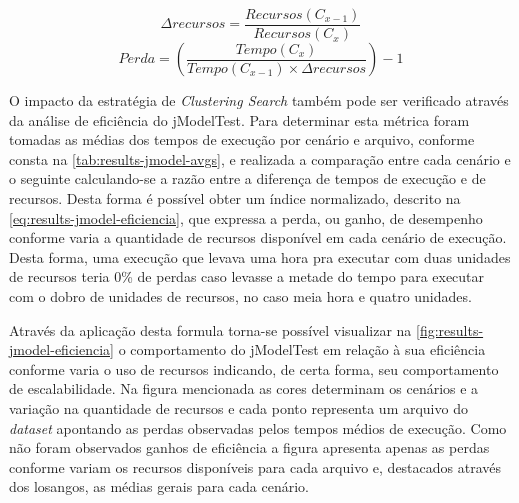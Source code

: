 \documentclass[english,brazilian]{UNISINOSmonografia} %
\begin{document}
\begin{equation}
\Delta{recursos} = \dfrac{Recursos(C_{x-1})}{Recursos(C_{x})}
\end{equation}
\begin{equation}\label{eq:results-jmodel-eficiencia}
Perda = 
\left(
	\dfrac
		{Tempo(C_{x})}
		{Tempo(C_{x-1}) \times \Delta{recursos}}
\right)-1
\end{equation}


O impacto da estratégia de \textit{Clustering Search} também pode ser verificado através da análise de eficiência do jModelTest.
%
Para determinar esta métrica foram tomadas as médias dos tempos de execução por cenário e arquivo, conforme consta na \autoref{tab:results-jmodel-avgs}, e realizada a comparação entre cada cenário e o seguinte calculando-se a razão entre a diferença de tempos de execução e de recursos.
%
Desta forma é possível obter um índice normalizado, descrito na \autoref{eq:results-jmodel-eficiencia}, que expressa a perda, ou ganho, de desempenho conforme varia a quantidade de recursos disponível em cada cenário de execução.
%
Desta forma, uma execução que levava uma hora pra executar com duas unidades de recursos teria 0\% de perdas caso levasse a metade do tempo para executar com o dobro de unidades de recursos, no caso meia hora e quatro unidades.



Através da aplicação desta formula torna-se possível visualizar na \autoref{fig:results-jmodel-eficiencia} o comportamento do jModelTest em relação à sua eficiência conforme varia o uso de recursos indicando, de certa forma, seu comportamento de escalabilidade.
%
Na figura mencionada as cores determinam os cenários e a variação na quantidade de recursos e cada ponto representa um arquivo do \textit{dataset} apontando as perdas observadas pelos tempos médios de execução.
%
Como não foram observados ganhos de eficiência a figura apresenta apenas as perdas conforme variam os recursos disponíveis para cada arquivo e, destacados através dos losangos, as médias gerais para cada cenário.
\end{document}
